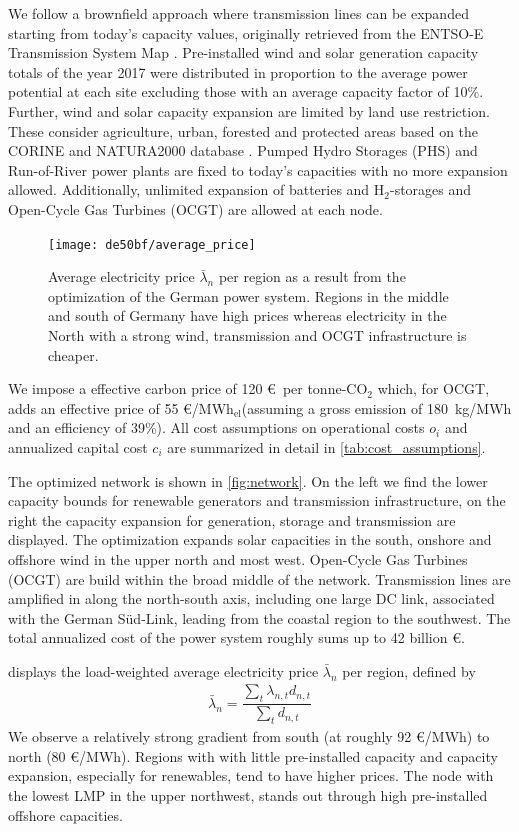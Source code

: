 \documentclass[11pt,twocolumn]{article}
\newcommand{\lmp}[1][n]{\lambda_{#1,t}}
\newcommand{\averagelmp}{\bar{\lambda}_n}
\newcommand{\demand}[1][n]{d_{#1,t}}
\newcommand{\megawatthour}{MWh$_\text{el}$}
\begin{document}
We follow a brownfield approach where transmission lines can be expanded starting from today's capacity values, originally retrieved from the ENTSO-E Transmission System Map \cite{entso-e_entso-e_nodate}. Pre-installed wind and solar generation capacity totals of the year 2017 were distributed in proportion to the average power potential at each site excluding those with an average capacity factor of 10\%. Further, wind and solar capacity expansion are limited by land use restriction. These consider agriculture, urban, forested and protected areas based on the CORINE and NATURA2000 database \cite{corine2012,natura2000}. Pumped Hydro Storages (PHS) and Run-of-River power plants are fixed to today's capacities with no more expansion allowed. Additionally, unlimited expansion of batteries and H$_{2}$-storages and Open-Cycle Gas Turbines (OCGT) are allowed at each node. 
% 
% 
\begin{figure}
    \centering
    \texttt{[image: de50bf/average\_price]}
    \caption{Average electricity price $\averagelmp$ per region as a result from the optimization of the German power system. Regions in the middle and south of Germany have high prices whereas electricity in the North with a strong wind, transmission and OCGT infrastructure is cheaper.}
    \label{fig:average_price}
\end{figure}
We impose a effective carbon price of 120 \euro\, per tonne-CO$_{2}$ which, for OCGT, adds an effective price of 55 \euro/\megawatthour (assuming a gross emission of 180~kg/MWh and an efficiency of 39\%). All cost assumptions on operational costs $o_i$ and annualized capital cost $c_i$ are summarized in detail in \cref{tab:cost_assumptions}. 

The optimized network is shown in  \cref{fig:network}. On the left we find the lower capacity bounds for renewable generators and transmission infrastructure, on the right the capacity expansion for generation, storage and transmission are displayed. The optimization expands solar capacities in the south, onshore and offshore wind in the upper north and most west. Open-Cycle Gas Turbines (OCGT) are build within the broad middle of the network. Transmission lines are amplified in along the north-south axis, including one large DC link, associated with the German S\"ud-Link, leading from the coastal region to the southwest. 
The total annualized cost of the power system roughly sums up to 42 billion \euro.
% 

 displays the load-weighted average electricity price $\averagelmp$ per region, defined by 
\begin{align}
    \averagelmp = \dfrac{\sum_{t} \lmp \demand}{\sum_t \demand}    
\end{align}
We observe a relatively strong gradient from south (at roughly 92 \euro/MWh) to north (80 \euro/MWh). Regions with with little pre-installed capacity and capacity expansion, especially for renewables, tend to have higher prices. The node with the lowest LMP in the upper northwest, stands out through high pre-installed offshore capacities. \\
 
\end{document}
